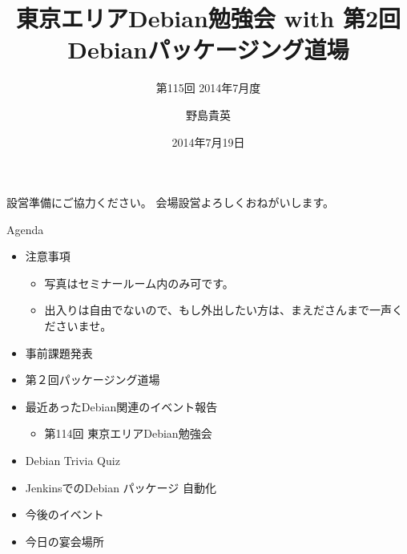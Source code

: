 \title{東京エリアDebian勉強会 with 第2回 Debianパッケージング道場}
\subtitle{第115回 2014年7月度}
\author{野島貴英}
\date{2014年7月19日}



\begin{frame}
\titlepage{}
\end{frame}

\begin{frame}{設営準備にご協力ください。}
会場設営よろしくおねがいします。
\end{frame}

\begin{frame}{Agenda}
 \begin{minipage}[t]{0.45\hsize}
  \begin{itemize}
   \item 注意事項
	 \begin{itemize}
	  \item 写真はセミナールーム内のみ可です。
          \item 出入りは自由でないので、もし外出したい方は、まえださんまで一声くださいませ。
	 \end{itemize}
   \item 事前課題発表
   \item 第２回パッケージング道場
  \end{itemize}
 \end{minipage} 
 \begin{minipage}[t]{0.45\hsize}
  \begin{itemize}
   \item 最近あったDebian関連のイベント報告
	 \begin{itemize}
	  \item 第114回 東京エリアDebian勉強会
	 \end{itemize}
   \item Debian Trivia Quiz
   \item JenkinsでのDebian パッケージ 自動化
   \item 今後のイベント
   \item 今日の宴会場所
  \end{itemize}
 \end{minipage}
\end{frame}

